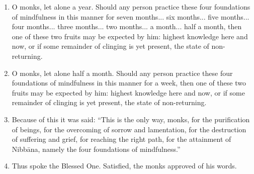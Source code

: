\documentclass[a4 paper, 12pt]{article}
\begin{document}
\begin{multicols}{2}
\begin{enumerate}[resume]
\item O monks, let alone a year. Should any person practice these four foundations of mindfulness in this manner for seven months... six months... five months... four months... three months... two months... a month... half a month, then one of these two fruits may be expected by him: highest knowledge here and now, or if some remainder of clinging is yet present, the state of non-returning.
\item O monks, let alone half a month. Should any person practice these four foundations of mindfulness in this manner for a week, then one of these two fruits may be expected by him: highest knowledge here and now, or if some remainder of clinging is yet present, the state of non-returning.
\item Because of this it was said: “This is the only way, monks, for the purification of beings, for the overcoming of sorrow and lamentation, for the destruction of suffering and grief, for reaching the right path, for the attainment of Nibbāna, namely the four foundations of mindfulness.”
\item Thus spoke the Blessed One. Satisfied, the monks approved of his words.

\end{enumerate}

\end{multicols}
\end{document}
